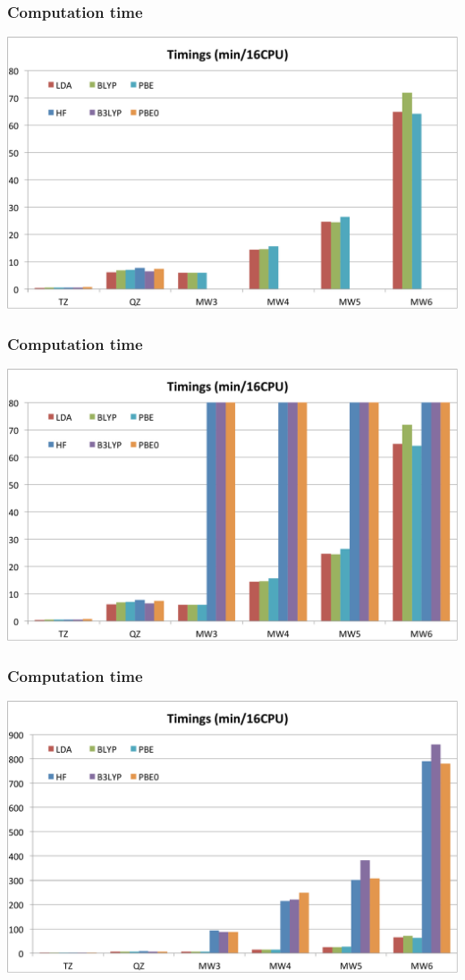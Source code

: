 \begin{frame}
\frametitle{Computation time}
\centering
\includegraphics[scale=0.3]{figures/time_2.pdf}
\end{frame}

\begin{frame}
\frametitle{Computation time}
\centering
\includegraphics[scale=0.3]{figures/time_3.pdf}
\end{frame}

\begin{frame}
\frametitle{Computation time}
\centering
\includegraphics[scale=0.3]{figures/time_4.pdf}
\end{frame}

